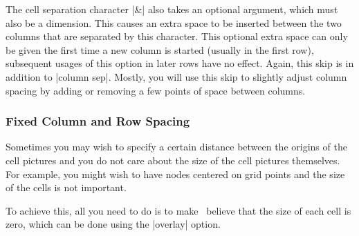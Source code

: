 The cell separation character |&| also takes an optional
argument, which must also be a dimension. This causes an extra space
to be inserted between the two columns that are separated by this
character. This optional extra space can only be given the first time
a new column is started (usually in the first row), subsequent usages
of this option in later rows have no effect. Again, this skip is in
addition to |column sep|. Mostly, you will use this skip to slightly
adjust column spacing by adding or removing a few points of space
between columns.
\begin{codeexample}[]
\end{codeexample}



\subsubsection{Fixed Column and Row Spacing}

Sometimes you may wish to specify a certain distance between the
origins of the cell pictures and you do not care about the size of the
cell pictures themselves. For example, you might wish to have nodes
centered on grid points and the size of the cells is not important.

To achieve this, all you need to do is to make \tikzname\ believe that
the size of each cell is zero, which can be done using the |overlay|
option.

\begin{codeexample}[]
\end{codeexample}

